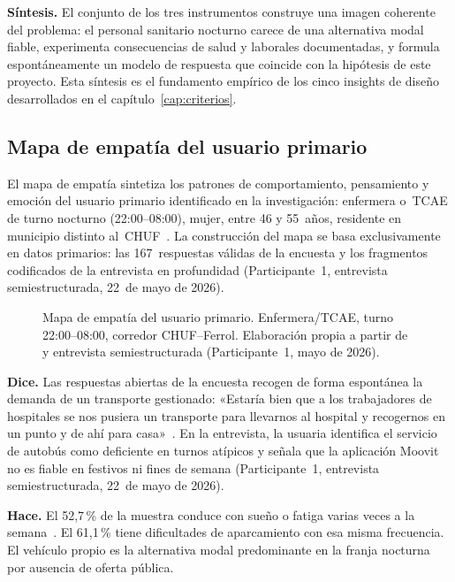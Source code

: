 \textbf{Síntesis.} El conjunto de los tres instrumentos construye una imagen coherente del problema: el personal sanitario nocturno carece de una alternativa modal fiable, experimenta consecuencias de salud y laborales documentadas, y formula espontáneamente un modelo de respuesta que coincide con la hipótesis de este proyecto. Esta síntesis es el fundamento empírico de los cinco insights de diseño desarrollados en el capítulo~\ref{cap:criterios}.

\subsection{Mapa de empatía del usuario primario}
\label{sec:mapa-empatia}

El mapa de empatía sintetiza los patrones de comportamiento, pensamiento y emoción del usuario primario identificado en la investigación: enfermera o~\acs{TCAE} de turno nocturno (22:00--08:00), mujer, entre 46 y 55~años, residente en municipio distinto al~\acs{CHUF}~\parencite{LouridoRegueira2026}. La construcción del mapa se basa exclusivamente en datos primarios: las 167~respuestas válidas de la encuesta y los fragmentos codificados de la entrevista en profundidad (Participante~1, entrevista semiestructurada, 22~de mayo de 2026).

\begin{figure}[htbp]
  \centering
  \fbox{\rule{0pt}{10cm}\rule{0.95\textwidth}{0pt}}
  \caption{Mapa de empatía del usuario primario. Enfermera/\acs{TCAE},
    turno 22:00--08:00, corredor \acs{CHUF}--Ferrol.
    Elaboración propia a partir de \parencite{LouridoRegueira2026}
    y entrevista semiestructurada (Participante~1, mayo de 2026).}
  \label{fig:mapa-empatia}
\end{figure}

\textbf{Dice.} Las respuestas abiertas de la encuesta recogen de forma espontánea la demanda de un transporte gestionado: «Estaría bien que a los trabajadores de hospitales se nos pusiera un transporte para llevarnos al hospital y recogernos en un punto y de ahí para casa»~\parencite{LouridoRegueira2026}. En la entrevista, la usuaria identifica el servicio de autobús como deficiente en turnos atípicos y señala que la aplicación Moovit no es fiable en festivos ni fines de semana (Participante~1, entrevista semiestructurada, 22~de mayo de 2026).

\textbf{Hace.} El 52{,}7\,\% de la muestra conduce con sueño o fatiga varias veces a la semana~\parencite{LouridoRegueira2026}. El 61{,}1\,\% tiene dificultades de aparcamiento con esa misma frecuencia. El vehículo propio es la alternativa modal predominante en la franja nocturna por ausencia de oferta pública.

